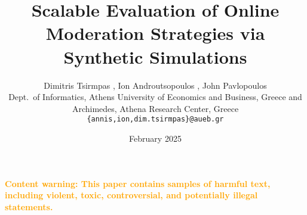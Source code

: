 \documentclass[hidelinks]{article}
\title{Scalable Evaluation of Online Moderation Strategies via Synthetic Simulations}
\author{
    Dimitris Tsirmpas \orcidlink{0000-0002-5675-3939}, Ion Androutsopoulos \orcidlink{0009-0000-2969-0509}, John Pavlopoulos \orcidlink{0000-0001-9188-7425} \\
    Dept.\ of Informatics, Athens University of Economics and Business, Greece and \\
    Archimedes, Athena Research Center, Greece \\
    \texttt{\{annis,ion,dim.tsirmpas\}@aueb.gr}
}
\date{February 2025}
\newcommand{\textWarning}[1]{\begin{center}\textcolor{orange}{\textbf{#1}}\end{center}}
\begin{document}
\maketitle

\textWarning{Content warning: This paper contains samples of harmful text, including violent, toxic, controversial, and potentially illegal statements.}











\printbibliography


\end{document}
